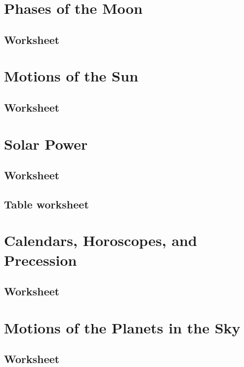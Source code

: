 \documentclass[12pt]{article}
\begin{document}
\newpage
\section{Phases of the Moon}\label{apx:lab_04}
\subsection{Worksheet}\label{apx:lab_04_ws}


\newpage
\section{Motions of the Sun}\label{apx:lab_05}
\subsection{Worksheet}\label{apx:lab_05_ws}


\newpage
\section{Solar Power}\label{apx:lab_06}
\subsection{Worksheet}\label{apx:lab_06_ws}


\newpage
\subsection{Table worksheet}\label{apx:lab_06_tb}
%

\newpage
\section{Calendars, Horoscopes, and Precession}\label{apx:lab_07}
\subsection{Worksheet}\label{apx:lab_07_ws}


\newpage
\section{Motions of the Planets in the Sky}\label{apx:lab_08}
\subsection{Worksheet}\label{apx:lab_08_ws}
%
\end{document}
